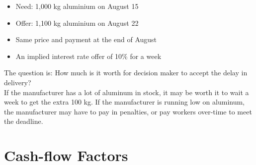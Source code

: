 \begin{example}
    \begin{itemize}
        \item Need: 1,000 kg aluminium on August 15
        \item Offer: 1,100 kg aluminium on August 22
        \item Same price and payment at the end of August
        \item An implied interest rate offer of 10\% for a week
    \end{itemize}
    The question is: How much is it worth for decision maker to accept the delay in delivery? \\
    If the manufacturer has a lot of aluminum in stock, it may be worth it to wait a week to get the extra 100 kg. If the manufacturer is running low on aluminum, the manufacturer may have to pay in penalties, or pay workers over-time to meet the deadline.
\end{example}



\section{Cash-flow Factors}

